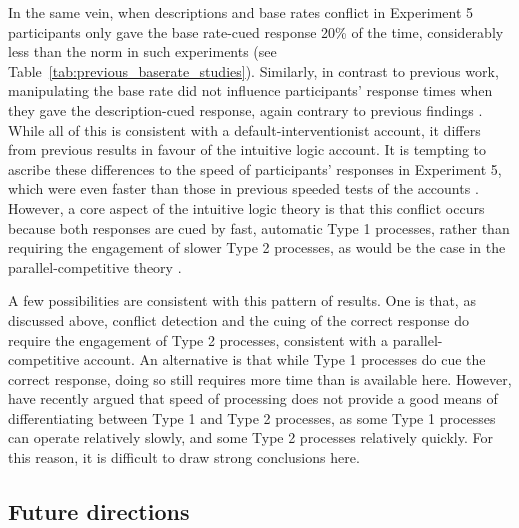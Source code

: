 In the same vein,
when descriptions and base rates conflict in Experiment 5
participants only gave the base rate-cued response 20\% of the time,
considerably less than the norm in such experiments (see Table~\ref{tab:previous_baserate_studies}).
Similarly, in contrast to previous work,
manipulating the base rate
did not influence participants' response times
when they gave the description-cued response,
again contrary to previous findings
\citep[e.g.][see again Table~\ref{tab:previous_baserate_studies}]{DeNeys2008}.
While all of this is consistent with a default-interventionist account,
it differs from previous results in favour of the intuitive logic account.
It is tempting to ascribe these differences to
the speed of participants' responses in Experiment 5,
which were even faster than those in
previous speeded tests of the accounts \citep[Experiment 2]{DeNeys2008a,Pennycook2014}.
However, a core aspect of the intuitive logic theory
is that this conflict occurs because
both responses are cued by fast, automatic Type 1 processes,
rather than requiring the engagement of slower Type 2 processes,
as would be the case in the parallel-competitive theory \citep{Sloman1996}.

A few possibilities are consistent with this pattern of results.
One is that, as discussed above, conflict detection and the cuing of the correct response
do require the engagement of Type 2 processes, consistent with a parallel-competitive account.
An alternative is that while Type 1 processes do cue the correct response,
doing so still requires more time than is available here.
However, \citet[see also \citealp{Pennycook2014,Handley2011}]{Handley2015}
have recently argued that speed of processing does not provide a good means
of differentiating between Type 1 and Type 2 processes,
as  some Type 1 processes can operate relatively slowly,
and some Type 2 processes relatively quickly.
For this reason, it is difficult to draw strong conclusions here.



\subsection{Future directions}


